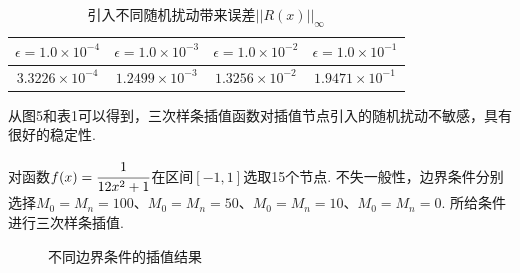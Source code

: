 \documentclass[12pt]{article}
\begin{document}
\begin{table}[h]
\centering
\setlength{\abovecaptionskip}{10pt}
\caption{引入不同随机扰动带来误差$||R(x)||_{\infty}$}
\begin{tabular}{cccc}
\hline
$\epsilon=1.0 \times 10^{-4}$& $\epsilon=1.0 \times 10^{-3}$& 
$\epsilon=1.0 \times 10^{-2}$& $\epsilon=1.0 \times 10^{-1}$\\
\hline
$3.3226\times10^{-4}$& $1.2499\times10^{-3}$& 
$1.3256\times10^{-2}$& $1.9471\times10^{-1}$\\
\hline
\end{tabular}
\end{table}

\par 从图5和表1可以得到，三次样条插值函数对插值节点引入的随机扰动不敏感，具有很好的稳定性.

\par 对函数$f(x)=\cfrac{1}{12x^{2}+1}$在区间$[-1,1]$选取15个节点. 不失一般性，边界条件分别选择$M_{0}=M_{n}=100$、$M_{0}=M_{n}=50$、$M_{0}=M_{n}=10$、$M_{0}=M_{n}=0$.
所给条件进行三次样条插值.

\begin{figure}[h]
	\label{fig07} 
	\caption{不同边界条件的插值结果}
\end{figure}
\end{document}
